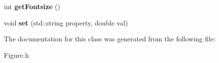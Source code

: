 \begin{DoxyCompactItemize}
\item 
\hypertarget{classkeycpp_1_1_figure_a6c1e59c4e8288e3880bde70db3723037}{int {\bfseries get\-Fontsize} ()}\label{classkeycpp_1_1_figure_a6c1e59c4e8288e3880bde70db3723037}

\item 
\hypertarget{classkeycpp_1_1_figure_a7375fe8611759fda180d626f91eab510}{void {\bfseries set} (std\-::string property, double val)}\label{classkeycpp_1_1_figure_a7375fe8611759fda180d626f91eab510}

\end{DoxyCompactItemize}


The documentation for this class was generated from the following file\-:\begin{DoxyCompactItemize}
\item 
Figure.\-h\end{DoxyCompactItemize}
